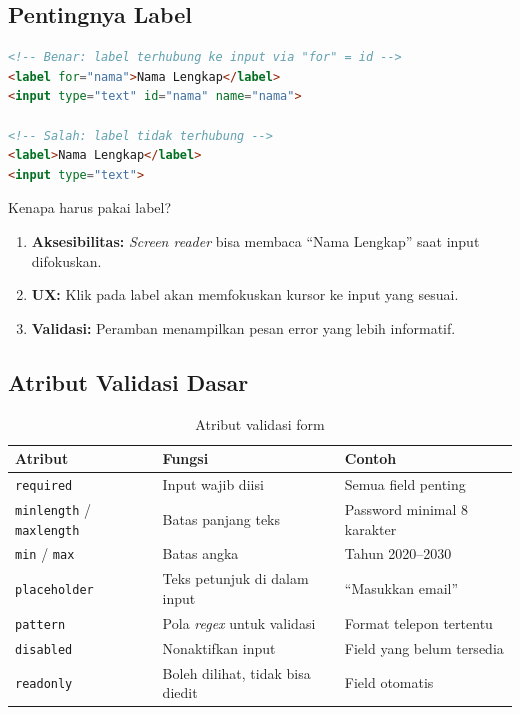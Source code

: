\subsection{Pentingnya Label}

\begin{lstlisting}[language=HTML, caption={Perbandingan label benar dan salah}, label={lst:m04-label}]
<!-- Benar: label terhubung ke input via "for" = id -->
<label for="nama">Nama Lengkap</label>
<input type="text" id="nama" name="nama">

<!-- Salah: label tidak terhubung -->
<label>Nama Lengkap</label>
<input type="text">
\end{lstlisting}

\begin{catatan}
Kenapa harus pakai label?
\begin{enumerate}
  \item \textbf{Aksesibilitas:} \emph{Screen reader} bisa membaca ``Nama Lengkap'' saat input difokuskan.
  \item \textbf{UX:} Klik pada label akan memfokuskan kursor ke input yang sesuai.
  \item \textbf{Validasi:} Peramban menampilkan pesan error yang lebih informatif.
\end{enumerate}
\end{catatan}

\subsection{Atribut Validasi Dasar}

\begin{table}[ht]
\centering
\caption{Atribut validasi form}
\label{tab:m04-validasi}
\begin{tabular}{lp{4cm}p{5cm}}
\toprule
\textbf{Atribut} & \textbf{Fungsi} & \textbf{Contoh} \\
\midrule
\texttt{required} & Input wajib diisi & Semua field penting \\
\texttt{minlength} / \texttt{maxlength} & Batas panjang teks & Password minimal 8 karakter \\
\texttt{min} / \texttt{max} & Batas angka & Tahun 2020--2030 \\
\texttt{placeholder} & Teks petunjuk di dalam input & ``Masukkan email'' \\
\texttt{pattern} & Pola \emph{regex} untuk validasi & Format telepon tertentu \\
\texttt{disabled} & Nonaktifkan input & Field yang belum tersedia \\
\texttt{readonly} & Boleh dilihat, tidak bisa diedit & Field otomatis \\
\bottomrule
\end{tabular}
\end{table}

